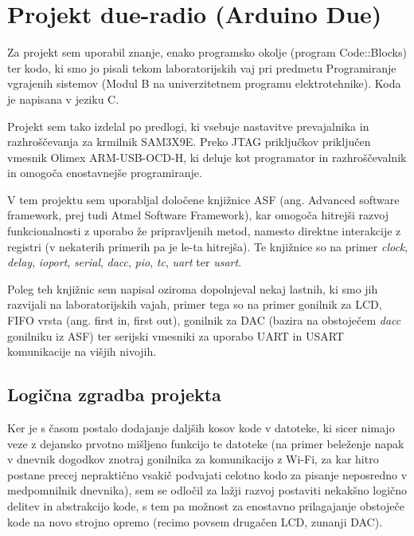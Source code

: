 \documentclass[12pt,a4paper,twoside,openright,slovene]{book}
\begin{document}
\section{Projekt due-radio (Arduino Due)} \label{due_radio_projekt}
Za projekt sem uporabil znanje, enako programsko okolje (program Code::Blocks) ter kodo, ki smo jo pisali tekom laboratorijskih vaj pri  predmetu Programiranje vgrajenih sistemov (Modul B na univerzitetnem programu elektrotehnike). Koda je napisana v jeziku C.

Projekt sem tako izdelal po predlogi, ki vsebuje nastavitve prevajalnika in razhroščevanja za krmilnik SAM3X9E. Preko JTAG priključkov priključen vmesnik Olimex ARM-USB-OCD-H, ki deluje kot programator in razhroščevalnik in omogoča enostavnejše programiranje.

V tem projektu sem uporabljal določene knjižnice ASF (ang. Advanced software framework, prej tudi Atmel Software Framework), kar omogoča hitrejši razvoj funkcionalnosti z uporabo že pripravljenih metod, namesto direktne interakcije z registri (v nekaterih primerih pa je le-ta hitrejša). Te knjižnice so na primer \textit{clock}, \textit{delay}, \textit{ioport}, \textit{serial}, \textit{dacc}, \textit{pio}, \textit{tc}, \textit{uart} ter \textit{usart}.

Poleg teh knjižnic sem napisal oziroma dopolnjeval nekaj lastnih, ki smo jih razvijali na laboratorijskih vajah, primer tega so na primer gonilnik za LCD, FIFO vrsta (ang. first in, first out), gonilnik za DAC (bazira na obstoječem \textit{dacc} gonilniku iz ASF) ter serijski vmesniki za uporabo UART in USART komunikacije na višjih nivojih.


\subsection{Logična zgradba projekta} \label{due_radio_struktura_projekta}
Ker je s časom postalo dodajanje daljših kosov kode v datoteke, ki sicer nimajo veze z dejansko prvotno mišljeno funkcijo te datoteke (na primer beleženje napak v dnevnik dogodkov znotraj gonilnika za komunikacijo z Wi-Fi, za kar hitro postane precej nepraktično vsakič podvajati celotno kodo za pisanje neposredno v medpomnilnik dnevnika), sem se odločil za lažji razvoj postaviti nekakšno logično delitev in abstrakcijo kode, s tem pa možnost za enostavno prilagajanje obstoječe kode na novo strojno opremo (recimo povsem drugačen LCD, zunanji DAC).
\end{document}
